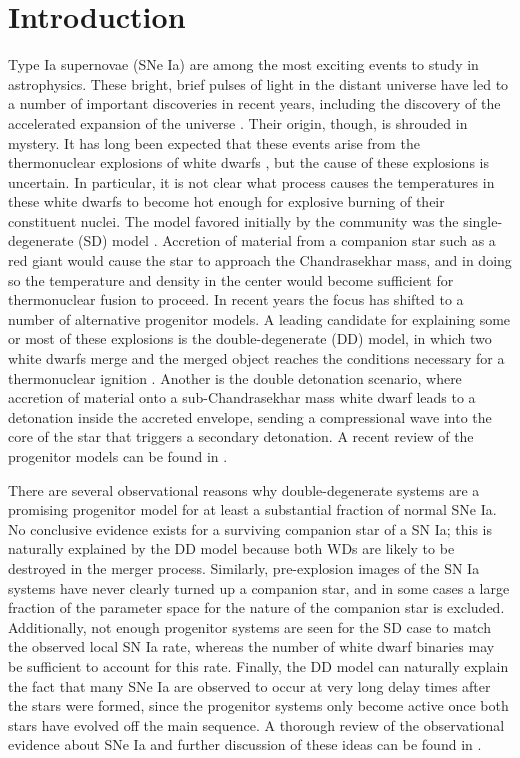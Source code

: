 \documentclass[iop]{../emulateapj}
\begin{document}
\section{Introduction}

Type Ia supernovae (SNe Ia) are among the most exciting
events to study in astrophysics. These bright, brief pulses of light
in the distant universe have led to a number of important discoveries
in recent years, including the discovery of the accelerated expansion
of the universe \citep{perlmutter1999,riess1998}. Their origin, though,
is shrouded in mystery. It has long been expected that these
events arise from the thermonuclear explosions of white dwarfs
\citep{hoyle_fowler:1960}, but the cause of these explosions is
uncertain. In particular, it is not clear what process causes the
temperatures in these white dwarfs to become hot enough for explosive
burning of their constituent nuclei. The model favored initially by the
community was the single-degenerate (SD) model
\citep{whelan_iben:1973}. Accretion of material from a companion star
such as a red giant would cause the star to approach the Chandrasekhar
mass, and in doing so the temperature and density in the center would
become sufficient for thermonuclear fusion to proceed. In
recent years the focus has shifted to a number of alternative progenitor models. A
leading candidate for explaining some or most of these explosions is
the double-degenerate (DD) model, in which two white dwarfs merge and
the merged object reaches the conditions necessary for a thermonuclear
ignition \citep{ibentutukov:1984,webbink:1984}. Another is the double
detonation scenario, where accretion of material onto a
sub-Chandrasekhar mass white dwarf leads to a detonation inside the
accreted envelope, sending a compressional wave into the
core of the star that triggers a secondary detonation. A recent
review of the progenitor models can be found in
\citet{hillebrandt:2013}.

There are several observational reasons why double-degenerate systems
are a promising progenitor model for at least a substantial fraction
of normal SNe Ia. No conclusive evidence exists for a surviving
companion star of a SN Ia; this is naturally explained by the DD model
because both WDs are likely to be destroyed in the merger
process. Similarly, pre-explosion images of the SN Ia systems have
never clearly turned up a companion star, and in some cases a large
fraction of the parameter space for the nature of the companion star
is excluded. Additionally, not enough progenitor systems are seen for
the SD case to match the observed local SN Ia rate, whereas the number
of white dwarf binaries may be sufficient to account for this
rate. Finally, the DD model can naturally explain the fact that many
SNe Ia are observed to occur at very long delay times after the stars
were formed, since the progenitor systems only become active once both
stars have evolved off the main sequence. A thorough review of the
observational evidence about SNe Ia and further discussion of these
ideas can be found in \cite{maoz:2014}.
\end{document}
